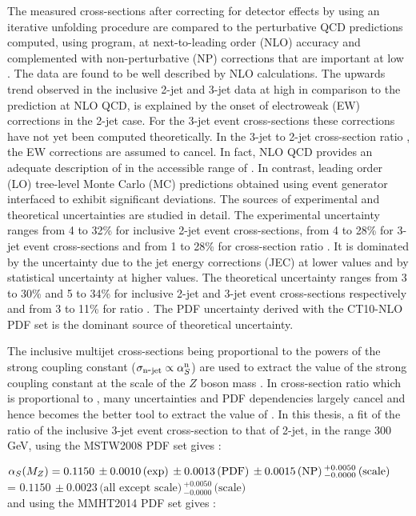 The measured cross-sections after correcting for detector effects by using an iterative unfolding procedure are compared to the perturbative QCD predictions computed, using \NLOJETPP program, at next-to-leading order (NLO) accuracy and complemented with non-perturbative (NP) corrections that are important at low \httwo. The data are found to be well described by NLO calculations. The upwards trend observed in the inclusive 2-jet and 3-jet data at high \httwo in comparison to the prediction at NLO QCD, is explained by the onset of electroweak (EW) corrections in the 2-jet case. For the 3-jet event cross-sections these corrections have not yet been computed theoretically. In the 3-jet to 2-jet cross-section ratio \ratio, the EW corrections are assumed to cancel. In fact, NLO QCD provides an adequate description of \ratio in the accessible range of \httwo. In contrast, leading order (LO) tree-level Monte Carlo (MC) predictions obtained using \MadGraphF event generator interfaced to \PYTHIAS exhibit significant deviations. The sources of experimental and theoretical uncertainties are studied in detail. The experimental uncertainty ranges from 4 to 32\% for inclusive 2-jet event cross-sections, from 4 to 28\% for 3-jet event cross-sections and from 1 to 28\% for cross-section ratio \ratio. It is dominated by the uncertainty due to the jet energy corrections (JEC) at lower \httwo values and by statistical uncertainty at higher \httwo values. The theoretical uncertainty ranges from 3 to 30\% and 5 to 34\% for inclusive 2-jet and 3-jet event cross-sections respectively and from 3 to 11\% for ratio \ratio. The PDF uncertainty derived with the CT10-NLO PDF set is the dominant source of theoretical uncertainty.

The inclusive multijet cross-sections being proportional to the powers of the strong coupling constant \alps ($\sigma_{\rm n\mbox{-} jet} \propto\alpha_S^{\rm n}$) are used to extract the value of the strong coupling constant at the scale of the $Z$ boson mass \alpsmz. In cross-section ratio \ratio which is proportional to \alps, many uncertainties and PDF dependencies largely cancel and hence becomes the better tool to extract the value of \alpsmz. In this thesis, a fit of the ratio of the inclusive 3-jet event cross-section to that of 2-jet, \ratio in the range 300 \ls \httwo {} GeV, using the MSTW2008 PDF set gives : 

$\alpha_S(M_Z) = 0.1150\,\pm0.0010\,\textrm{(exp)}\,\pm0.0013\,\textrm{(PDF)}\,\pm0.0015\,\textrm{(NP)}\,^{+0.0050}_{-0.0000}\,\textrm{(scale)}$ \\ \hspace*{24mm} = $0.1150\,\pm0.0023\,\textrm{(all except scale)}\,^{+0.0050}_{-0.0000}\,\textrm{(scale)}$ \\
and using the MMHT2014 PDF set gives :  

